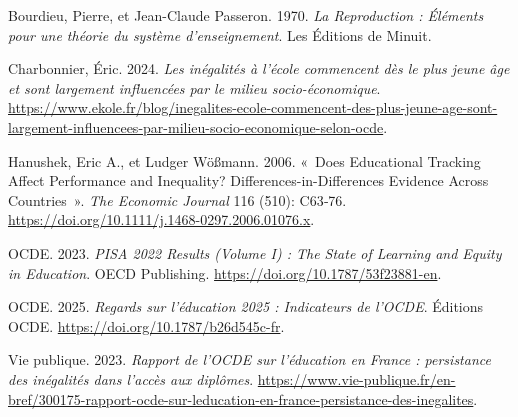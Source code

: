 \documentclass[
  french,
  11pt,
  a4paper,
]{report}
\newlength{\cslhangindent}
\newenvironment{CSLReferences}[2] %
 {\begin{list}{}{%
  \setlength{\itemindent}{0pt}
  \setlength{\leftmargin}{0pt}
  \setlength{\parsep}{0pt}
  \ifodd #1
   \setlength{\leftmargin}{\cslhangindent}
   \setlength{\itemindent}{-1\cslhangindent}
  \fi
  \setlength{\itemsep}{#2\baselineskip}}}
 {\end{list}}
\begin{document}
\protect{}\label{refs}
\begin{CSLReferences}{1}{1}
Bourdieu, Pierre, et Jean-Claude Passeron. 1970. \emph{La Reproduction :
Éléments pour une théorie du système d'enseignement}. Les Éditions de
Minuit.

Charbonnier, Éric. 2024. \emph{Les inégalités à l'école commencent dès
le plus jeune âge et sont largement influencées par le milieu
socio-économique}.
\url{https://www.ekole.fr/blog/inegalites-ecole-commencent-des-plus-jeune-age-sont-largement-influencees-par-milieu-socio-economique-selon-ocde}.

Hanushek, Eric A., et Ludger Wößmann. 2006. {«~Does Educational Tracking
Affect Performance and Inequality? Differences-in-Differences Evidence
Across Countries~»}. \emph{The Economic Journal} 116 (510): C63‑76.
\url{https://doi.org/10.1111/j.1468-0297.2006.01076.x}.

OCDE. 2023. \emph{PISA 2022 Results (Volume I) : The State of Learning
and Equity in Education}. OECD Publishing.
\url{https://doi.org/10.1787/53f23881-en}.

OCDE. 2025. \emph{Regards sur l'éducation 2025 : Indicateurs de l'OCDE}.
Éditions OCDE. \url{https://doi.org/10.1787/b26d545c-fr}.

Vie publique. 2023. \emph{Rapport de l'OCDE sur l'éducation en France :
persistance des inégalités dans l'accès aux diplômes}.
\url{https://www.vie-publique.fr/en-bref/300175-rapport-ocde-sur-leducation-en-france-persistance-des-inegalites}.

\end{CSLReferences}
\end{document}
